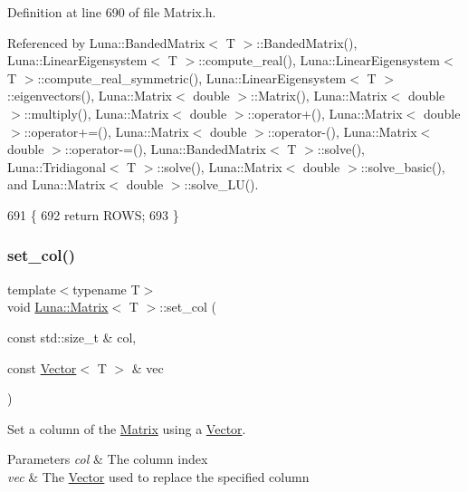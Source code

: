 Definition at line 690 of file Matrix.\+h.



Referenced by Luna\+::\+Banded\+Matrix$<$ T $>$\+::\+Banded\+Matrix(), Luna\+::\+Linear\+Eigensystem$<$ T $>$\+::compute\+\_\+real(), Luna\+::\+Linear\+Eigensystem$<$ T $>$\+::compute\+\_\+real\+\_\+symmetric(), Luna\+::\+Linear\+Eigensystem$<$ T $>$\+::eigenvectors(), Luna\+::\+Matrix$<$ double $>$\+::\+Matrix(), Luna\+::\+Matrix$<$ double $>$\+::multiply(), Luna\+::\+Matrix$<$ double $>$\+::operator+(), Luna\+::\+Matrix$<$ double $>$\+::operator+=(), Luna\+::\+Matrix$<$ double $>$\+::operator-\/(), Luna\+::\+Matrix$<$ double $>$\+::operator-\/=(), Luna\+::\+Banded\+Matrix$<$ T $>$\+::solve(), Luna\+::\+Tridiagonal$<$ T $>$\+::solve(), Luna\+::\+Matrix$<$ double $>$\+::solve\+\_\+basic(), and Luna\+::\+Matrix$<$ double $>$\+::solve\+\_\+\+L\+U().


\begin{DoxyCode}
691   \{
692     \textcolor{keywordflow}{return} ROWS;
693   \}
\end{DoxyCode}
\mbox{\label{classLuna_1_1Matrix_a0fafe609e8aa9811537de0f83ef92c99}} 
\subsubsection{\texorpdfstring{set\+\_\+col()}{set\_col()}}
{\footnotesize\ttfamily template$<$typename T$>$ \\
void \hyperlink{classLuna_1_1Matrix}{Luna\+::\+Matrix}$<$ T $>$\+::set\+\_\+col (\begin{DoxyParamCaption}\item[{const std\+::size\+\_\+t \&}]{col,  }\item[{const \hyperlink{classLuna_1_1Vector}{Vector}$<$ T $>$ \&}]{vec }\end{DoxyParamCaption})\hspace{0.3cm}{\ttfamily [inline]}}



Set a column of the \hyperlink{classLuna_1_1Matrix}{Matrix} using a \hyperlink{classLuna_1_1Vector}{Vector}. 


\begin{DoxyParams}{Parameters}
{\em col} & The column index \\
\hline
{\em vec} & The \hyperlink{classLuna_1_1Vector}{Vector} used to replace the specified column \\
\hline
\end{DoxyParams}


